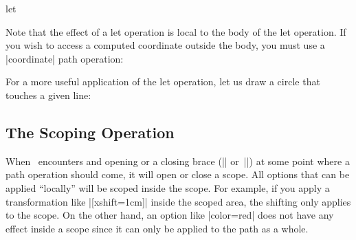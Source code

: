 \begin{pathoperation}{let}{
        }
\begin{codeexample}[preamble={\usetikzlibrary{calc}}]
\end{codeexample}

    Note that the effect of a let operation is local to the body of the let
    operation. If you wish to access a computed coordinate outside the body,
    you must use a |coordinate| path operation:
\begin{codeexample}[preamble={\usetikzlibrary{calc}}]
\end{codeexample}

    For a more useful application of the let operation, let us draw a circle
    that touches a given line:
\begin{codeexample}[pre={\pgfmathsetseed{1}},preamble={\usetikzlibrary{calc}}]
\end{codeexample}
\end{pathoperation}


\subsection{The Scoping Operation}

When \tikzname\ encounters and opening or a closing brace (|{| or~|}|) at some
point where a path operation should come, it will open or close a scope. All
options that can be applied ``locally'' will be scoped inside the scope. For
example, if you apply a transformation like |[xshift=1cm]| inside the scoped
area, the shifting only applies to the scope. On the other hand, an option like
|color=red| does not have any effect inside a scope since it can only be
applied to the path as a whole.

